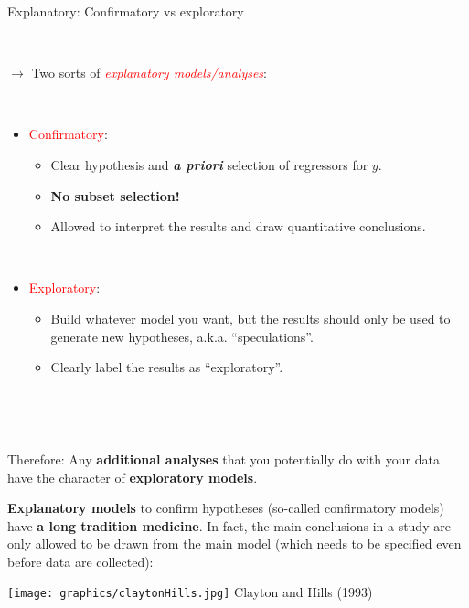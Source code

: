 \documentclass[10pt,ignorenonframetext,]{beamer}
\providecommand{\tightlist}{%
  \setlength{\itemsep}{0pt}\setlength{\parskip}{0pt}}
\begin{document}
\begin{frame}

\begin{block}{Explanatory: Confirmatory vs exploratory}

\(~\)

\(\rightarrow\) Two sorts of
\emph{\textcolor{red}{explanatory models/analyses}}:

\(~\)

\begin{itemize}
\tightlist
\item
  \textcolor{red}{Confirmatory}:

  \begin{itemize}
  \tightlist
  \item
    Clear hypothesis and \emph{\bf a priori} selection of regressors for
    \(y\).
  \item
    \textbf{No subset selection!}
  \item
    Allowed to interpret the results and draw quantitative conclusions.
  \end{itemize}
\end{itemize}

\(~\)

\begin{itemize}
\tightlist
\item
  \textcolor{red}{Exploratory}:

  \begin{itemize}
  \tightlist
  \item
    Build whatever model you want, but the results should only be used
    to generate new hypotheses, a.k.a. ``speculations''.
  \item
    Clearly label the results as ``exploratory''.
  \end{itemize}
\end{itemize}

\(~\)

\(~\)

Therefore: Any \textbf{additional analyses} that you potentially do with
your data have the character of \textbf{exploratory models}.

\end{block}

\end{frame}

\begin{frame}

\textbf{Explanatory models} to confirm hypotheses (so-called
confirmatory models) have \textbf{a long tradition medicine}. In fact,
the main conclusions in a study are only allowed to be drawn from the
main model (which needs to be specified even before data are collected):

\texttt{[image: graphics/claytonHills.jpg]} Clayton and
Hills (1993)

\end{frame}
\end{document}
